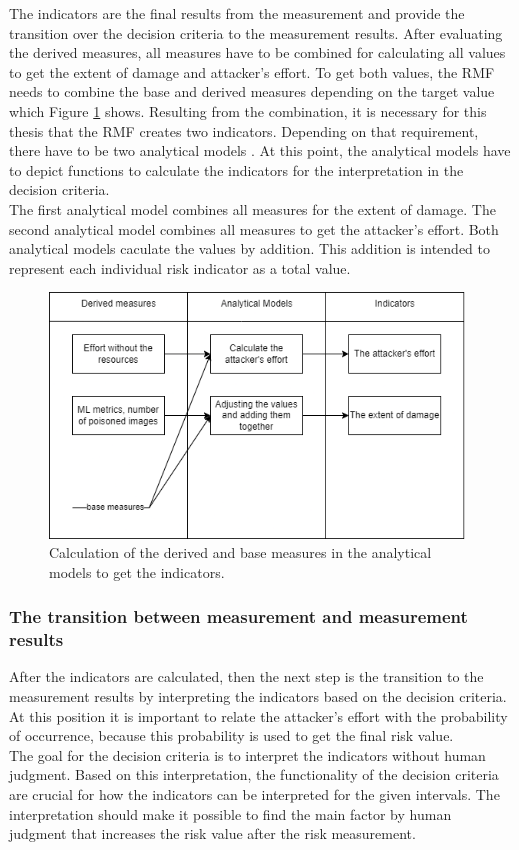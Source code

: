 The indicators are the final results from the measurement and provide the transition over the decision criteria to the measurement results. After evaluating the derived measures, all measures have to be combined for calculating all values to get the extent of damage and attacker's effort. To get both values, the RMF needs to combine the base and derived measures depending on the target value which Figure \ref{fig:indicators} shows. Resulting from the combination, it is necessary for this thesis that the RMF creates two indicators. Depending on that requirement, there have to be two analytical models \cite{ISO_27004_2009}. At this point, the analytical models have to depict functions to calculate the indicators for the interpretation in the decision criteria. \\ The first analytical model combines all measures for the extent of damage. The second analytical model combines all measures to get the attacker's effort. Both analytical models caculate the values by addition. This addition is intended to represent each individual risk indicator as a total value.

\begin{figure}[ht!]
  \centering
  \includegraphics[width=11cm]{pictures/indicators.png}
  \caption{Calculation of the derived and base measures in the analytical models to get the indicators.}
  \label{fig:indicators}
\end{figure}

\newpage

\subsubsection*{The transition between measurement and measurement results}

After the indicators are calculated, then the next step is the transition to the measurement results by interpreting the indicators based on the decision criteria. At this position it is important to
relate the attacker's effort with the probability of occurrence, because this probability is used to get the final risk value. \\
The goal for the decision criteria is to interpret the indicators without human judgment. Based on this interpretation, the functionality of the decision criteria are crucial for how the indicators can be interpreted for the given intervals. The interpretation should make it possible to find the main factor by human judgment that increases the risk value after the risk measurement.

